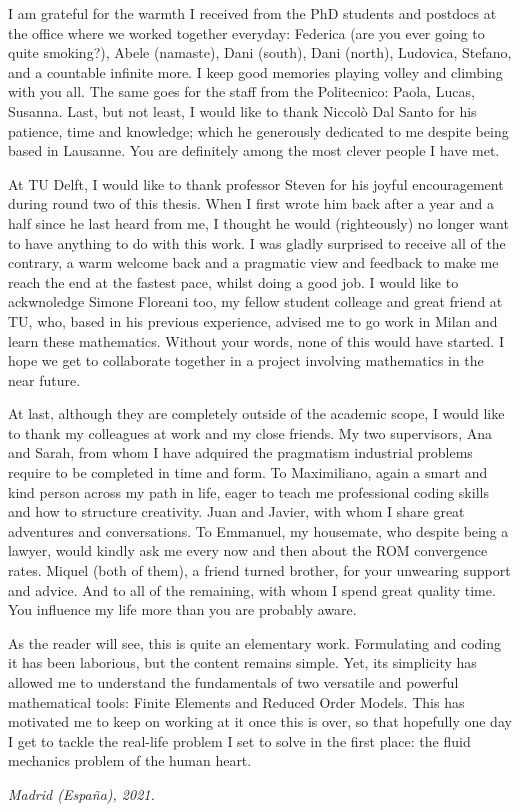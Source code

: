 \documentclass[thesis.tex]{subfiles}
\begin{document}
I am grateful for the warmth I received from the PhD students and postdocs 
at the office where we worked together everyday: 
Federica (are you ever going to quite smoking?), 
Abele (namaste), 
Dani (south), 
Dani (north), 
Ludovica, 
Stefano, 
and a countable infinite more.
I keep good memories playing volley and climbing with you all.
The same goes for the staff from the Politecnico: 
Paola, 
Lucas, 
Susanna.
Last, but not least, I would like to thank Niccolò Dal Santo for his patience, time and knowledge; 
which he generously dedicated to me despite being based in Lausanne. 
You are definitely among the most clever people I have met.

At TU Delft, I would like to thank professor Steven 
for his joyful encouragement during round two of this thesis.
When I first wrote him back after a year and a half since he last heard from me, 
I thought he would (righteously) no longer want to have anything to do with this work.
I was gladly surprised to receive all of the contrary, 
a warm welcome back and a pragmatic view and feedback to make me reach the end at the fastest pace, 
whilst doing a good job.
I would like to ackwnoledge Simone Floreani too, my fellow student colleage and great friend at TU,
who, based in his previous experience, 
advised me to go work in Milan and learn these mathematics.
Without your words, none of this would have started. 
I hope we get to collaborate together in a project involving mathematics in the near future.

At last, although they are completely outside of the academic scope, 
I would like to thank my colleagues at work and my close friends.
My two supervisors, Ana and Sarah, from whom I have adquired 
the pragmatism industrial problems require to be completed in time and form.
To Maximiliano, again a smart and kind person across my path in life, 
eager to teach me professional coding skills and how to structure creativity.
Juan and Javier, with whom I share great adventures and conversations.
To Emmanuel, my housemate, who despite being a lawyer, 
would kindly ask me every now and then about the ROM convergence rates.
Miquel (both of them), a friend turned brother, for your unwearing support and advice.
And to all of the remaining, with whom I spend great quality time.
You influence my life more than you are probably aware.

As the reader will see, this is quite an elementary work.
Formulating and coding it has been laborious, but the content remains simple.
Yet, its simplicity has allowed me to understand the fundamentals of 
two versatile and powerful mathematical tools: 
Finite Elements and Reduced Order Models.
This has motivated me to keep on working at it once this is over, 
so that hopefully one day I get to tackle the real-life problem 
I set to solve in the first place: 
the fluid mechanics problem of the human heart.

\begin{flushright}
    \vspace{5mm}
    \textit{Madrid (España), 2021.}    
\end{flushright}
\end{document}
